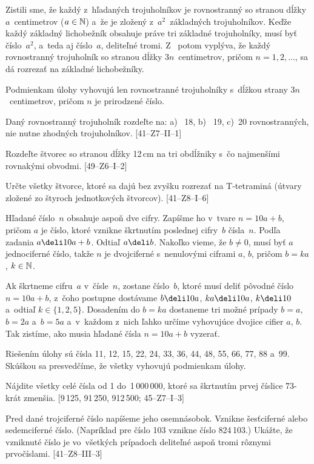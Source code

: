 {Zistili sme, že každý z~hľadaných trojuholníkov je rovnostranný
so stranou dĺžky $a$~centimetrov ($a\in\Bbb N$) a~že je zložený
z~$a^2$~základných trojuholníkov. Keďže každý základný lichobežník
obsahuje práve tri základné trojuholníky, musí byť číslo~$a^2$,  
a~teda aj číslo~$a$, deliteľné tromi. Z~\obr{} potom vyplýva, že každý
rovnostranný trojuholník so stranou dĺžky $3n$~centimetrov, pričom
$n=1,2,\dots$, sa dá rozrezať na základné lichobežníky.

\zaver
Podmienkam úlohy vyhovujú len rovnostranné
trojuholníky s~dĺžkou strany $3n$~centimetrov, pričom $n$ je prirodzené
číslo.

Daný rovnostranný trojuholník rozdeľte na:   a)~ 18,   b)~ 19,
c)~20  rovnostranných,  nie nutne zhodných trojuholníkov.
[41--Z7--II--1]

Rozdeľte štvorec so stranou dĺžky 12\,cm na tri obdĺžniky s~čo
najmenšími rovnakými obvodmi.
[49--Z6--I--2]

Určte všetky štvorce, ktoré sa dajú bez zvyšku rozrezať na
T-tetraminá (útvary~\Tm{} zložené zo štyroch jednotkových
štvorcov).                        [41--Z8--I--6]

}

{%
Hľadané číslo~$n$ obsahuje aspoň dve cifry. Zapíšme ho v~tvare
$n=10a+b$, pričom $a$ je číslo, ktoré vznikne škrtnutím poslednej
cifry~$b$ čísla~$n$. Podľa zadania $a\deli10a+b$. Odtiaľ
$a\deli b$. Nakoľko vieme, že $b\ne0$, musí byť $a$
jednociferné číslo, takže $n$ je dvojciferné s~nenulovými
ciframi $a$, $b$, pričom $b=ka$, $k\in\Bbb N$.

Ak škrtneme cifru~$a$ v~čísle~$n$, zostane číslo~$b$, ktoré
musí deliť pôvodné číslo $n=10a+b$, z~čoho postupne dostávame
$b\deli10a$, $ka\deli10a$, $k\deli10$ a~odtiaľ $k\in\{1,2,5\}$.
Dosadením do $b=ka$ dostaneme tri možné prípady $b=a$, $b=2a$  
a~$b=5a$ a~v~každom z~nich ľahko určíme vyhovujúce dvojice cifier
$a$, $b$. Tak zistíme, ako musia hľadané čísla $n=10a+b$
vyzerať.

\zaver
Riešením úlohy sú čísla 11, 12, 15, 22, 24, 33,
36, 44, 48, 55, 66, 77, 88 a~99. Skúškou sa presvedčíme, že
všetky vyhovujú podmienkam úlohy.


Nájdite všetky celé čísla od 1 do~1\,000\,000, ktoré sa škrtnutím
prvej číslice 73-krát zmenšia.
[9\,125,  91\,250,  912\,500; 45--Z7--I--3]

Pred dané trojciferné číslo napíšeme jeho osemnásobok. Vznikne
šesťciferné alebo sedemciferné číslo. (Napríklad pre číslo 103
vznikne číslo 824\,103.) Ukážte, že vzniknuté číslo je vo~všetkých
prípadoch deliteľné aspoň tromi rôznymi prvočíslami.
[41--Z8--III--3]
}

